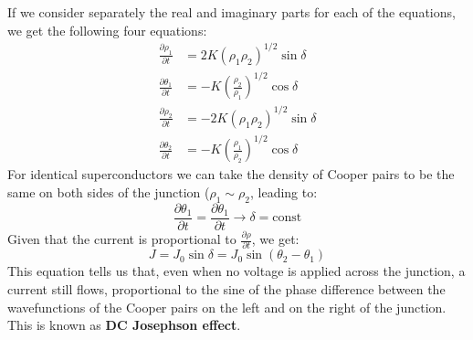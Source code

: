 \documentclass[a4paper,11pt]{article}
\newcommand{\ddp}[2]{\frac{\partial #1}{\partial #2 }}
\begin{document}
If we consider separately the real and imaginary parts for each of the equations, we get the following four equations:
\begin{equation}
\begin{aligned}
\ddp{\rho_1}{t} &= 2K (\rho_1 \rho_2)^{1/2} \sin{\delta}\\
\ddp{\theta_1}{t} &= - K \left(\frac{\rho_2}{\rho_1}\right)^{1/2} \cos{\delta}\\ 
\ddp{\rho_2}{t} &= -2K (\rho_1 \rho_2)^{1/2} \sin{\delta}\\
\ddp{\theta_2}{t} &= - K \left (\frac{\rho_1}{\rho_2} \right)^{1/2} \cos{\delta}
\end{aligned}
\end{equation}
For identical superconductors we can take the density of Cooper pairs to be the same on both sides of the junction ($\rho_1 \sim \rho_2$, leading to:
\begin{equation}
    \ddp{\theta_1}{t} = \ddp{\theta_1}{t} \longrightarrow \delta = \mbox{const} 
\end{equation}
Given that the current is proportional to $\ddp{\rho}{t}$, we get:
\begin{equation}
    J  = J_0 \sin{\delta} = J_0 \sin \left( \theta_2 - \theta_1 \right)
\end{equation}
This equation tells us that, even when no voltage is applied across the junction, a current still flows, proportional to the sine of the phase difference between the wavefunctions of the Cooper pairs on the left and on the right of the junction. This is known as {\bf DC Josephson effect}.
\end{document}
